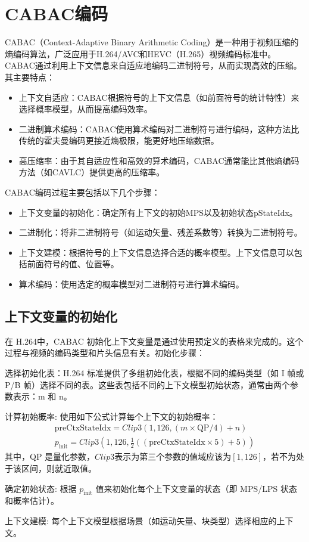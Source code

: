 \documentclass{/Users/hi/Study/template/code}
\begin{document}
\section{CABAC编码}
CABAC（Context-Adaptive Binary Arithmetic Coding）是一种用于视频压缩的熵编码算法，广泛应用于H.264/AVC和HEVC（H.265）视频编码标准中。CABAC通过利用上下文信息来自适应地编码二进制符号，从而实现高效的压缩。其主要特点：
\begin{itemize}
	\item 上下文自适应：CABAC根据符号的上下文信息（如前面符号的统计特性）来选择概率模型，从而提高编码效率。
	\item 二进制算术编码：CABAC使用算术编码对二进制符号进行编码，这种方法比传统的霍夫曼编码更接近熵极限，能更好地压缩数据。
	\item 高压缩率：由于其自适应性和高效的算术编码，CABAC通常能比其他熵编码方法（如CAVLC）提供更高的压缩率。
\end{itemize}

CABAC编码过程主要包括以下几个步骤：
\begin{itemize}
	\item 上下文变量的初始化：确定所有上下文的初始MPS以及初始状态pStateIdx。
	\item 二进制化：将非二进制符号（如运动矢量、残差系数等）转换为二进制符号。
	\item 上下文建模：根据符号的上下文信息选择合适的概率模型。上下文信息可以包括前面符号的值、位置等。
	\item 算术编码：使用选定的概率模型对二进制符号进行算术编码。
\end{itemize}

\subsection{上下文变量的初始化}
在 H.264中，CABAC 初始化上下文变量是通过使用预定义的表格来完成的。这个过程与视频的编码类型和片头信息有关。初始化步骤：

\begin{serialNumber}
	\item 选择初始化表：H.264 标准提供了多组初始化表，根据不同的编码类型（如 I 帧或 P/B 帧）选择不同的表。这些表包括不同的上下文模型初始状态，通常由两个参数表示：m 和 n。
	\item 计算初始概率: 使用如下公式计算每个上下文的初始概率：
	\begin{gather}
		\text{preCtxStateIdx} = Clip3(1, 126, (m \times \text{QP} / 4) + n) \\
		p_{\text{init}} = Clip3(1, 126, \frac{1}{2}((\text{preCtxStateIdx} \times 5) + 5))
	\end{gather}
	其中，QP 是量化参数，$Clip3$表示为第三个参数的值域应该为$[1,126]$，若不为处于该区间，则就近取值。

	\item 确定初始状态: 根据 $p_{\text{init}}$ 值来初始化每个上下文变量的状态（即 MPS/LPS 状态和概率估计）。
	\item 上下文建模: 每个上下文模型根据场景（如运动矢量、块类型）选择相应的上下文。
\end{serialNumber}
\end{document}
